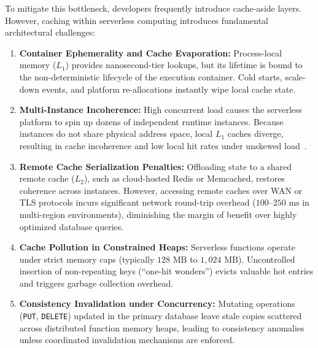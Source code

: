 \documentclass[conference]{IEEEtran}
\begin{document}
To mitigate this bottleneck, developers frequently introduce cache-aside layers. However, caching within serverless computing introduces fundamental architectural challenges:
\begin{enumerate}
    \item \textbf{Container Ephemerality and Cache Evaporation:} Process-local memory ($L_1$) provides nanosecond-tier lookups, but its lifetime is bound to the non-deterministic lifecycle of the execution container. Cold starts, scale-down events, and platform re-allocations instantly wipe local cache state.
    \item \textbf{Multi-Instance Incoherence:} High concurrent load causes the serverless platform to spin up dozens of independent runtime instances. Because instances do not share physical address space, local $L_1$ caches diverge, resulting in cache incoherence and low local hit rates under unskewed load~\cite{wang2018peeking}.
    \item \textbf{Remote Cache Serialization Penalties:} Offloading state to a shared remote cache ($L_2$), such as cloud-hosted Redis or Memcached, restores coherence across instances. However, accessing remote caches over WAN or TLS protocols incurs significant network round-trip overhead ($100\text{--}250\text{ ms}$ in multi-region environments), diminishing the margin of benefit over highly optimized database queries.
    \item \textbf{Cache Pollution in Constrained Heaps:} Serverless functions operate under strict memory caps (typically $128\text{ MB}$ to $1,024\text{ MB}$). Uncontrolled insertion of non-repeating keys (``one-hit wonders'') evicts valuable hot entries and triggers garbage collection overhead.
    \item \textbf{Consistency Invalidation under Concurrency:} Mutating operations (\texttt{PUT}, \texttt{DELETE}) updated in the primary database leave stale copies scattered across distributed function memory heaps, leading to consistency anomalies unless coordinated invalidation mechanisms are enforced.
\end{enumerate}
\end{document}
